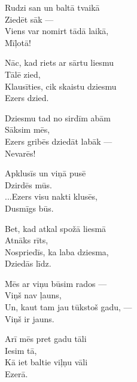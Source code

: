\documentclass[14pt]{extarticle}
\begin{document}
{{Rudzi san un baltā tvaikā\\
\mbox{}\hspace{10pt} Ziedēt sāk ---\\
Viens var nomirt tādā laikā,\\
\mbox{}\hspace{10pt} Mīļotā!

Nāc, kad riets ar sārtu liesmu\\
\mbox{}\hspace{10pt} Tālē zied,\\
Klausīties, cik skaistu dziesmu\\
\mbox{}\hspace{10pt} Ezers dzied.

Dziesmu tad no sirdīm abām\\
\mbox{}\hspace{10pt} Sāksim mēs,\\
Ezers gribēs dziedāt labāk ---\\
\mbox{}\hspace{10pt} Nevarēs!

Apklusīs un viņā pusē\\
\mbox{}\hspace{10pt} Dzirdēs mūs.\\
...Ezers visu nakti klusēs,\\
\mbox{}\hspace{10pt} Dusmīgs būs.

Bet, kad atkal spožā liesmā\\
\mbox{}\hspace{10pt} Atnāks rīts,\\
Nospriedīs, ka laba dziesma,\\
\mbox{}\hspace{10pt} Dziedās līdz.

Mēs ar viņu būsim rados ---\\
\mbox{}\hspace{10pt} Viņš nav ļauns,\\
Un, kaut tam jau tūkstoš gadu, ---\\
\mbox{}\hspace{10pt} Viņš ir jauns. 

Arī mēs pret gadu tāli\\
\mbox{}\hspace{10pt} Iesim tā,\\
Kā iet baltie viļņu vāli\\
\mbox{}\hspace{10pt} Ezerā.



}}
\end{document}
